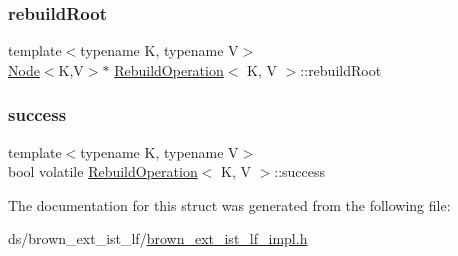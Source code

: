 \mbox{\label{structRebuildOperation_a47844819714e7764a8109ef8985a10f5}} 
\subsubsection{\texorpdfstring{rebuild\+Root}{rebuildRoot}}
{\footnotesize\ttfamily template$<$typename K, typename V$>$ \\
\hyperlink{classNode}{Node}$<$K,V$>$$\ast$ \hyperlink{structRebuildOperation}{Rebuild\+Operation}$<$ K, V $>$\+::rebuild\+Root}

\mbox{\label{structRebuildOperation_adbf3b4e4615739a27912b0a8d84e88eb}} 
\subsubsection{\texorpdfstring{success}{success}}
{\footnotesize\ttfamily template$<$typename K, typename V$>$ \\
bool volatile \hyperlink{structRebuildOperation}{Rebuild\+Operation}$<$ K, V $>$\+::success}



The documentation for this struct was generated from the following file\+:\begin{DoxyCompactItemize}
\item 
ds/brown\+\_\+ext\+\_\+ist\+\_\+lf/\hyperlink{brown__ext__ist__lf__impl_8h}{brown\+\_\+ext\+\_\+ist\+\_\+lf\+\_\+impl.\+h}\end{DoxyCompactItemize}
